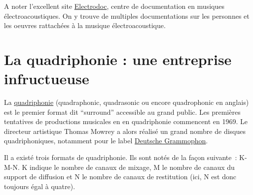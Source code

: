 \documentclass[
  letterpaper,
  DIV=11,
  numbers=noendperiod]{scrreprt}
\begin{document}
\begin{tcolorbox}[enhanced jigsaw, leftrule=.75mm, arc=.35mm, bottomtitle=1mm, colback=white, colbacktitle=quarto-callout-tip-color!10!white, opacityback=0, left=2mm, rightrule=.15mm, opacitybacktitle=0.6, breakable, toptitle=1mm, titlerule=0mm, bottomrule=.15mm, toprule=.15mm, coltitle=black, title=\textcolor{quarto-callout-tip-color}{\faLightbulb}\hspace{0.5em}{Astuce}]

A noter l'excellent site
\href{https://electrodoc.musiques-recherches.be/fr/accueil}{Electrodoc},
centre de documentation en musiques électroacoustiques. On y trouve de
multiples documentations sur les personnes et les oeuvres rattachées à
la musique électroacoustique.

\end{tcolorbox}

\hypertarget{la-quadriphonie-une-entreprise-infructueuse}{%
\section{La quadriphonie : une entreprise
infructueuse}\label{la-quadriphonie-une-entreprise-infructueuse}}

La \href{https://en.wikipedia.org/wiki/Quadraphonic_sound}{quadriphonie}
(quadraphonic, quadrasonic ou encore quadrophonic en anglais) est le
premier format dit ``surround'' accessible au grand public. Les
premières tentatives de productions musicales en en quadriphonie
commencent en 1969. Le directeur artistique Thomas Mowrey a alors
réalisé un grand nombre de disques quadriphoniques, notamment pour le
label \href{https://en.wikipedia.org/wiki/Deutsche_Grammophon}{Deutsche
Grammophon}.

Il a existé trois formats de quadriphonie. Ils sont notés de la façon
suivante~: K-M-N. K indique le nombre de canaux de mixage, M le nombre
de canaux du support de diffusion et N le nombre de canaux de
restitution (ici, N est donc toujours égal à quatre).
\end{document}
